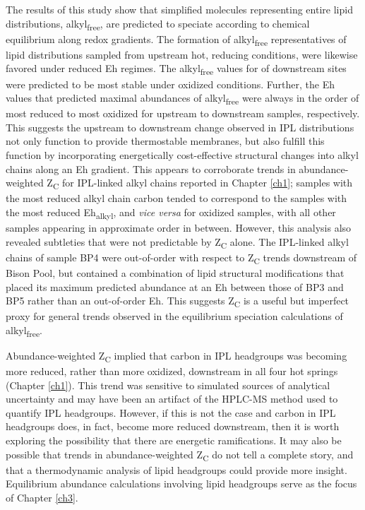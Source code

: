 The results of this study show that simplified molecules representing entire lipid distributions, alkyl\textsubscript{free}, are predicted to speciate according to chemical equilibrium along redox gradients. The formation of alkyl\textsubscript{free} representatives of lipid distributions sampled from upstream hot, reducing conditions, were likewise favored under reduced Eh regimes. The alkyl\textsubscript{free} values for of downstream sites were predicted to be most stable under oxidized conditions. Further, the Eh values that predicted maximal abundances of alkyl\textsubscript{free} were always in the order of most reduced to most oxidized for upstream to downstream samples, respectively. This suggests the upstream to downstream change observed in IPL distributions not only function to provide thermostable membranes, but also fulfill this function by incorporating energetically cost-effective structural changes into alkyl chains along an Eh gradient. This appears to corroborate trends in abundance-weighted Z\textsubscript{C} for IPL-linked alkyl chains reported in Chapter \ref{ch1}; samples with the most reduced alkyl chain carbon tended to correspond to the samples with the most reduced Eh\textsubscript{alkyl}, and \textit{vice versa} for oxidized samples, with all other samples appearing in approximate order in between. However, this analysis also revealed subtleties that were not predictable by Z\textsubscript{C} alone. The IPL-linked alkyl chains of sample BP4 were out-of-order with respect to Z\textsubscript{C} trends downstream of Bison Pool, but contained a combination of lipid structural modifications that placed its maximum predicted abundance at an Eh between those of BP3 and BP5 rather than an out-of-order Eh. This suggests Z\textsubscript{C} is a useful but imperfect proxy for general trends observed in the equilibrium speciation calculations of alkyl\textsubscript{free}.


Abundance-weighted Z\textsubscript{C} implied that carbon in IPL headgroups was becoming more reduced, rather than more oxidized, downstream in all four hot springs (Chapter \ref{ch1}). This trend was sensitive to simulated sources of analytical uncertainty and may have been an artifact of the HPLC-MS method used to quantify IPL headgroups. However, if this is not the case and carbon in IPL headgroups does, in fact, become more reduced downstream, then it is worth exploring the possibility that there are energetic ramifications. It may also be possible that trends in abundance-weighted Z\textsubscript{C} do not tell a complete story, and that a thermodynamic analysis of lipid headgroups could provide more insight. Equilibrium abundance calculations involving lipid headgroups serve as the focus of Chapter \ref{ch3}.

